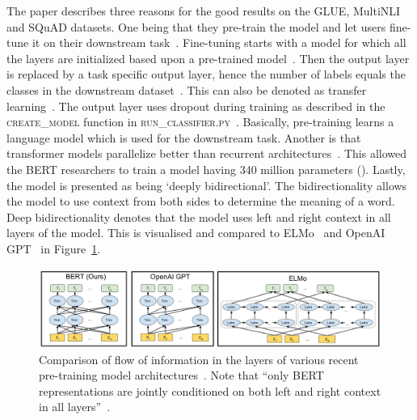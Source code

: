 The paper describes three reasons for the good results on the GLUE, MultiNLI and SQuAD datasets.
One being that they pre-train the model and let users fine-tune it on their downstream task~\citep{devlin2018}.
Fine-tuning starts with a model for which all the layers are initialized based upon a pre-trained model~\citep{guo2016deep}.
Then the output layer is replaced by a task specific output layer, hence the number of labels equals the classes in the downstream dataset~\citep{guo2016deep}.
This can also be denoted as transfer learning~\citep{cirecsan2012transfer}.
The output layer uses dropout during training as described in the \textsc{create\_model} function in \textsc{run\_classifier.py}~\citep{devlin2019classifiers}.
Basically, pre-training learns a language model which is used for the downstream task.
Another is that transformer models parallelize better than recurrent architectures~\citep{vaswani2017attention}.
This allowed the BERT researchers to train a model having 340 million parameters (). %
Lastly, the model is presented as being `deeply bidirectional'.
The bidirectionality allows the model to use context from both sides to determine the meaning of a word.
Deep bidirectionality denotes that the model uses left and right context in all layers of the model.
This is visualised and compared to ELMo~\citep{peters2018} and OpenAI GPT~\citep{radford2018improving} in Figure~\ref{fig:bert_comparison}.
\begin{figure}[htbp]
    \begin{center}
        \includegraphics[width=\textwidth]{figures/deeply_bidirectional.png}
    \end{center}
    \caption{
        Comparison of flow of information in the layers of various recent pre-training model architectures~\cite[Figure 1]{devlin2018}.
        Note that ``only BERT representations are jointly conditioned on both left and right context in all layers''~\citep{devlin2018}.
    }
    \label{fig:bert_comparison}
\end{figure}

